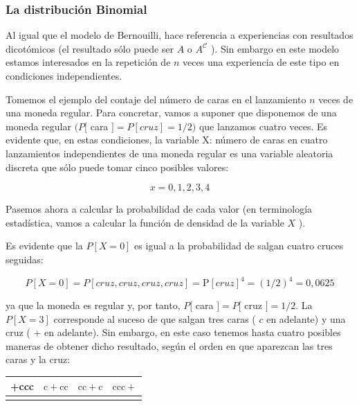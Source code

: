 \documentclass[
]{article}
\begin{document}
\subsubsection{La distribución Binomial}\label{la-distribuciuxf3n-binomial}

Al igual que el modelo de Bernouilli, hace referencia a experiencias con resultados dicotómicos (el resultado sólo puede ser \(A\) o \(A^{\mathcal{C}}\) ). Sin embargo en este modelo estamos interesados en la repetición de \(n\) veces una experiencia de este tipo en condiciones independientes.

Tomemos el ejemplo del contaje del número de caras en el lanzamiento \(n\) veces de una moneda regular.
Para concretar, vamos a suponer que disponemos de una moneda regular \((P[\) cara \(]=P[c r u z]=1 / 2)\) que lanzamos cuatro veces. Es evidente que, en estas condiciones, la variable X: número de caras en cuatro lanzamientos independientes de una moneda regular es una variable aleatoria discreta que sólo puede tomar cinco posibles valores:

\[
x=0,1,2,3,4
\]

Pasemos ahora a calcular la probabilidad de cada valor (en terminología estadística, vamos a calcular la función de densidad de la variable \(X\) ).

Es evidente que la \(P[X=0]\) es igual a la probabilidad de salgan cuatro cruces seguidas:

\[
P[X=0]=P[c r u z, c r u z, c r u z, c r u z]=\mathrm{P}[c r u z]^{4}=(1 / 2)^{4}=0,0625
\]

ya que la moneda es regular y, por tanto, \(P[\) cara \(]=P[\) cruz \(]=1 / 2\).
La \(P[X=3]\) corresponde al suceso de que salgan tres caras ( \(c\) en adelante) y una cruz ( + en adelante). Sin embargo, en este caso tenemos hasta cuatro posibles maneras de obtener dicho resultado, según el orden en que aparezcan las tres caras y la cruz:

\begin{longtable}[]{@{}
  >{\centering\arraybackslash}p{}
  >{\centering\arraybackslash}p{}
  >{\centering\arraybackslash}p{}
  >{\centering\arraybackslash}p{}@{}}
\toprule\noalign{}
\begin{minipage}[b]{\linewidth}\centering
+ccc
\end{minipage} & \begin{minipage}[b]{\linewidth}\centering
\(\mathrm{c}+\mathrm{cc}\)
\end{minipage} & \begin{minipage}[b]{\linewidth}\centering
\(\mathrm{cc}+\mathrm{c}\)
\end{minipage} & \begin{minipage}[b]{\linewidth}\centering
\(\mathrm{ccc}+\)
\end{minipage} \\
\midrule\noalign{}
\endhead
\bottomrule\noalign{}
\endlastfoot
\end{longtable}
\end{document}
